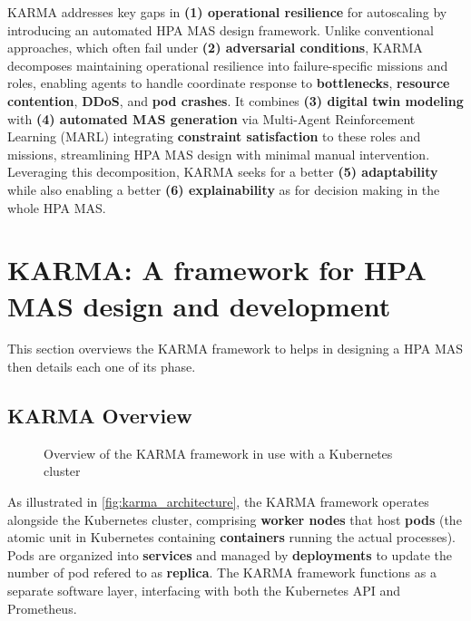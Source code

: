\documentclass[conference]{IEEEtran}
\begin{document}
KARMA addresses key gaps in \textbf{(1) operational resilience} for autoscaling by introducing an automated HPA MAS design framework. Unlike conventional approaches, which often fail under \textbf{(2) adversarial conditions}, KARMA decomposes maintaining operational resilience into failure-specific missions and roles, enabling agents to handle coordinate response to \textbf{bottlenecks}, \textbf{resource contention}, \textbf{DDoS}, and \textbf{pod crashes}. It combines \textbf{(3) digital twin modeling} with \textbf{(4) automated MAS generation} via Multi-Agent Reinforcement Learning (MARL) integrating \textbf{constraint satisfaction} to these roles and missions, streamlining HPA MAS design with minimal manual intervention. Leveraging this decomposition, KARMA seeks for a better \textbf{(5) adaptability} while also enabling a better \textbf{(6) explainability} as for decision making in the whole HPA MAS.


\section{KARMA: A framework for HPA MAS design and development}
\label{sec:proposed_approach}

This section overviews the KARMA framework to helps in designing a HPA MAS then details each one of its phase.

\subsection{KARMA Overview}

\begin{figure}[h!]
    \centering
    
    \caption{Overview of the KARMA framework in use with a Kubernetes cluster}
    \label{fig:karma_architecture}
\end{figure}

As illustrated in \autoref{fig:karma_architecture}, the KARMA framework operates alongside the Kubernetes cluster, comprising \textbf{worker nodes} that host \textbf{pods} (the atomic unit in Kubernetes containing \textbf{containers} running the actual processes). Pods are organized into \textbf{services} and managed by \textbf{deployments} to update the number of pod refered to as \textbf{replica}. The KARMA framework functions as a separate software layer, interfacing with both the Kubernetes API and Prometheus.
\end{document}
